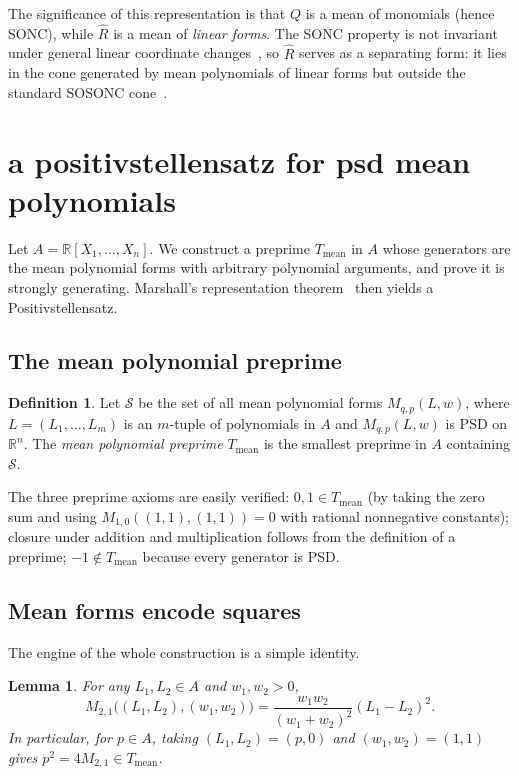 \documentclass{amsart}
\newtheorem{lemma}[thm]{Lemma}
\theoremstyle{definition}
\newtheorem{dfn}[thm]{Definition}
\numberwithin{equation}{section}
\newcommand{\reals}{\mathbb{R}}
\begin{document}
The significance of this representation is that $Q$ is a mean of monomials
(hence SONC), while $\hat{R}$ is a mean of \emph{linear forms}.  The SONC
property is not invariant under general linear coordinate
changes~\cite[Lemma~4.2.5]{MSc01}, so $\hat{R}$ serves as a separating form:
it lies in the cone generated by mean polynomials of linear forms but outside
the standard SOSONC cone~\cite[p.~107]{MSc01}.

\section{a positivstellensatz for psd mean polynomials}\label{sec:positiv}

Let $A=\reals[X_1,\dots,X_n]$.  We construct a preprime $T_{\mathrm{mean}}$
in $A$ whose generators are the mean polynomial forms with arbitrary
polynomial arguments, and prove it is strongly generating.  Marshall's
representation theorem~\cite{Marshall02} then yields a Positivstellensatz.

\subsection{The mean polynomial preprime}

\begin{dfn}\label{dfn:Tmean}
Let $\mathcal{S}$ be the set of all mean polynomial forms
$M_{q,p}(L,w)$, where $L=(L_1,\dots,L_m)$ is an $m$-tuple of polynomials in
$A$ and $M_{q,p}(L,w)$ is PSD on $\reals^n$.  The \emph{mean polynomial
preprime} $T_{\mathrm{mean}}$ is the smallest preprime in $A$ containing
$\mathcal{S}$.
\end{dfn}

The three preprime axioms are easily verified: $0,1\in T_{\mathrm{mean}}$
(by taking the zero sum and using $M_{1,0}((1,1),(1,1))=0$ with rational
nonnegative constants); closure under addition and multiplication follows
from the definition of a preprime; $-1\notin T_{\mathrm{mean}}$ because every
generator is PSD.

\subsection{Mean forms encode squares}

The engine of the whole construction is a simple identity.

\begin{lemma}\label{lem:mean-squares}
For any $L_1,L_2\in A$ and $w_1,w_2>0$,
\[
M_{2,1}\bigl((L_1,L_2),(w_1,w_2)\bigr)=\frac{w_1w_2}{(w_1+w_2)^2}(L_1-L_2)^2.
\]
In particular, for $p\in A$, taking $(L_1,L_2)=(p,0)$ and
$(w_1,w_2)=(1,1)$ gives $p^2=4M_{2,1}\in T_{\mathrm{mean}}$.
\end{lemma}
\end{document}
